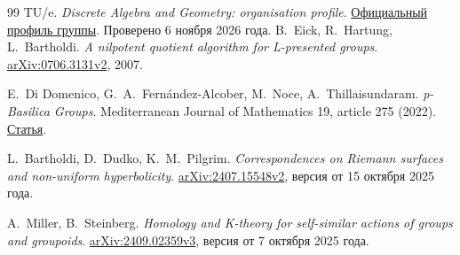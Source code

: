 \begin{thebibliography}{99}
TU/e. \emph{Discrete Algebra and Geometry: organisation profile}.
\href{https://research.tue.nl/en/organisations/discrete-algebra-and-geometry/}{Официальный профиль группы}.
Проверено 6 ноября 2026 года.
B.~Eick, R.~Hartung, L.~Bartholdi.
\emph{A nilpotent quotient algorithm for L-presented groups}.
\href{https://arxiv.org/abs/0706.3131v2}{arXiv:0706.3131v2}, 2007.

E.~Di Domenico, G.~A.~Fernández-Alcober, M.~Noce, A.~Thillaisundaram.
\emph{p-Basilica Groups}. Mediterranean Journal of Mathematics 19,
article 275 (2022).
\href{https://link.springer.com/article/10.1007/s00009-022-02187-z}{Статья}.

L.~Bartholdi, D.~Dudko, K.~M.~Pilgrim.
\emph{Correspondences on Riemann surfaces and non-uniform hyperbolicity}.
\href{https://arxiv.org/abs/2407.15548v2}{arXiv:2407.15548v2},
версия от 15 октября 2025 года.

A.~Miller, B.~Steinberg.
\emph{Homology and K-theory for self-similar actions of groups and groupoids}.
\href{https://arxiv.org/abs/2409.02359v3}{arXiv:2409.02359v3},
версия от 7 октября 2025 года.
\end{thebibliography}

